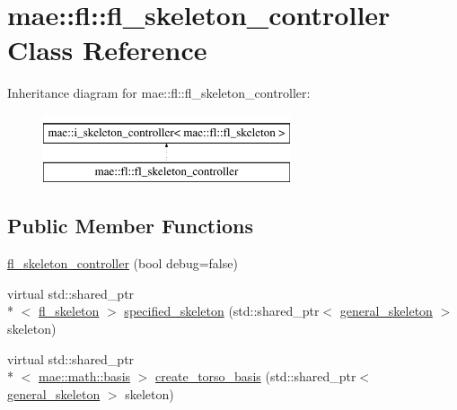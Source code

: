 \hypertarget{classmae_1_1fl_1_1fl__skeleton__controller}{\section{mae\-:\-:fl\-:\-:fl\-\_\-skeleton\-\_\-controller Class Reference}
\label{classmae_1_1fl_1_1fl__skeleton__controller}
}
Inheritance diagram for mae\-:\-:fl\-:\-:fl\-\_\-skeleton\-\_\-controller\-:\begin{figure}[H]
\begin{center}
\leavevmode
\includegraphics[height=2.000000cm]{classmae_1_1fl_1_1fl__skeleton__controller}
\end{center}
\end{figure}
\subsection*{Public Member Functions}
\begin{DoxyCompactItemize}
\item 
\hyperlink{classmae_1_1fl_1_1fl__skeleton__controller_a217858c5469e4d278d7b50b36750edd9}{fl\-\_\-skeleton\-\_\-controller} (bool debug=false)
\item 
virtual std\-::shared\-\_\-ptr\\*
$<$ \hyperlink{classmae_1_1fl_1_1fl__skeleton}{fl\-\_\-skeleton} $>$ \hyperlink{classmae_1_1fl_1_1fl__skeleton__controller_a0775153d13e802f14d2df3b5bcb51ff1}{specified\-\_\-skeleton} (std\-::shared\-\_\-ptr$<$ \hyperlink{classmae_1_1general__skeleton}{general\-\_\-skeleton} $>$ skeleton)
\item 
virtual std\-::shared\-\_\-ptr\\*
$<$ \hyperlink{classmae_1_1math_1_1basis}{mae\-::math\-::basis} $>$ \hyperlink{classmae_1_1fl_1_1fl__skeleton__controller_a54cfb81a3be142676d73654b271b46c2}{create\-\_\-torso\-\_\-basis} (std\-::shared\-\_\-ptr$<$ \hyperlink{classmae_1_1general__skeleton}{general\-\_\-skeleton} $>$ skeleton)
\end{DoxyCompactItemize}


